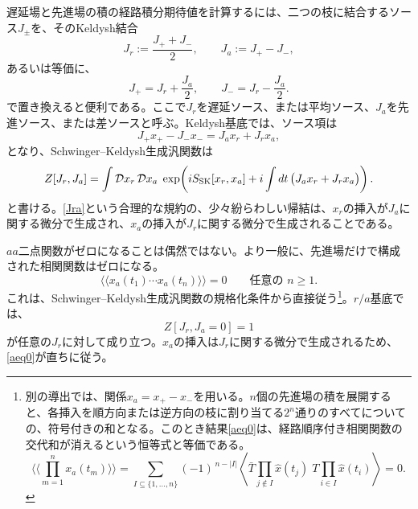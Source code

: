 \documentclass[a4paper,11pt,oneside]{article}
\theoremstyle{definition}
\numberwithin{equation}{section}
\newcommand{\expi}[1]{\langle \! \langle #1 \rangle \! \rangle}
\begin{document}
遅延場と先進場の積の経路積分期待値を計算するには、二つの枝に結合するソース\(J_\pm\)を、そのKeldysh結合
\begin{equation}\label{Jra}
J_r := \frac{J_+ + J_-}{2},
\qquad
J_a := J_+ - J_- ,
\end{equation}
あるいは等価に、
\begin{equation}
J_+ = J_r + \frac{J_a}{2},
\qquad
J_- = J_r - \frac{J_a}{2} .
\end{equation}
で置き換えると便利である。ここで\(J_r\)を遅延ソース、または平均ソース、\(J_a\)を先進ソース、または差ソースと呼ぶ。Keldysh基底では、ソース項は
\begin{equation}
J_+x_+ - J_-x_-
=
J_a x_r + J_r x_a ,
\end{equation}
となり、Schwinger--Keldysh生成汎関数は
\begin{equation}
Z[J_r,J_a]
=
\int \mathcal D x_r\,\mathcal D x_a\;
\exp\!\left(
iS_{\rm SK}[x_r,x_a]
+
i\int dt\,\bigl(J_a x_r + J_r x_a\bigr)
\right) .
\end{equation}
と書ける。\eqref{Jra}という合理的な規約の、少々紛らわしい帰結は、\(x_r\)の挿入が\(J_a\)に関する微分で生成され、\(x_a\)の挿入が\(J_r\)に関する微分で生成されることである。



$aa$二点関数がゼロになることは偶然ではない。より一般に、先進場だけで構成された相関関数はゼロになる。
\begin{equation}\label{aeq0}
\langle\!\langle x_a(t_1)\cdots x_a(t_n)\rangle\!\rangle = 0
\qquad
\text{任意の } n\geq 1 .
\end{equation}
これは、Schwinger--Keldysh生成汎関数の規格化条件から直接従う\footnote{別の導出では、関係$x_a=x_+ -x_-$を用いる。\(n\)個の先進場の積を展開すると、各挿入を順方向または逆方向の枝に割り当てる\(2^n\)通りのすべてについての、符号付きの和となる。このとき結果\eqref{aeq0}は、経路順序付き相関関数の交代和が消えるという恒等式と等価である。
\begin{equation}
\expi {\prod_{m=1}^n x_a(t_m) }
=
\sum_{I\subseteq \{1,\dots,n\}}
(-1)^{\,n-|I|}
\left\langle
\bar T \prod_{j\notin I}\hat x(t_j)\;
T \prod_{i\in I}\hat x(t_i)
\right\rangle
=0 .
\end{equation}
}。\(r/a\)基底では、
\[Z[J_r,J_a=0]=1 \]
が任意の\(J_r\)に対して成り立つ。\(x_a\)の挿入は\(J_r\)に関する微分で生成されるため、\eqref{aeq0}が直ちに従う。
\end{document}
